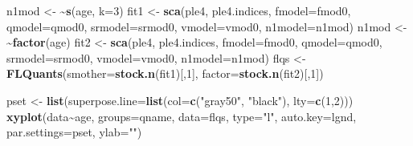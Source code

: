 \documentclass[
]{book}
\newenvironment{Shaded}{\begin{snugshade}}{\end{snugshade}}
\newcommand{\AttributeTok}[1]{\textcolor[rgb]{0.13,0.29,0.53}{#1}}
\newcommand{\DecValTok}[1]{\textcolor[rgb]{0.00,0.00,0.81}{#1}}
\newcommand{\ErrorTok}[1]{\textcolor[rgb]{0.64,0.00,0.00}{\textbf{#1}}}
\newcommand{\FunctionTok}[1]{\textcolor[rgb]{0.13,0.29,0.53}{\textbf{#1}}}
\newcommand{\NormalTok}[1]{#1}
\newcommand{\OtherTok}[1]{\textcolor[rgb]{0.56,0.35,0.01}{#1}}
\newcommand{\SpecialCharTok}[1]{\textcolor[rgb]{0.81,0.36,0.00}{\textbf{#1}}}
\newcommand{\StringTok}[1]{\textcolor[rgb]{0.31,0.60,0.02}{#1}}
\begin{document}
\begin{Shaded}
\begin{Highlighting}[]
\NormalTok{n1mod }\OtherTok{\textless{}{-}} \ErrorTok{\textasciitilde{}}\FunctionTok{s}\NormalTok{(age, }\AttributeTok{k=}\DecValTok{3}\NormalTok{)}
\NormalTok{fit1 }\OtherTok{\textless{}{-}} \FunctionTok{sca}\NormalTok{(ple4, ple4.indices, }\AttributeTok{fmodel=}\NormalTok{fmod0, }\AttributeTok{qmodel=}\NormalTok{qmod0, }\AttributeTok{srmodel=}\NormalTok{srmod0, }\AttributeTok{vmodel=}\NormalTok{vmod0, }\AttributeTok{n1model=}\NormalTok{n1mod)}
\NormalTok{n1mod }\OtherTok{\textless{}{-}} \ErrorTok{\textasciitilde{}}\FunctionTok{factor}\NormalTok{(age)}
\NormalTok{fit2 }\OtherTok{\textless{}{-}} \FunctionTok{sca}\NormalTok{(ple4, ple4.indices, }\AttributeTok{fmodel=}\NormalTok{fmod0, }\AttributeTok{qmodel=}\NormalTok{qmod0, }\AttributeTok{srmodel=}\NormalTok{srmod0, }\AttributeTok{vmodel=}\NormalTok{vmod0, }\AttributeTok{n1model=}\NormalTok{n1mod)}
\NormalTok{flqs }\OtherTok{\textless{}{-}} \FunctionTok{FLQuants}\NormalTok{(}\AttributeTok{smother=}\FunctionTok{stock.n}\NormalTok{(fit1)[,}\DecValTok{1}\NormalTok{], }\AttributeTok{factor=}\FunctionTok{stock.n}\NormalTok{(fit2)[,}\DecValTok{1}\NormalTok{])}
\end{Highlighting}
\end{Shaded}

\begin{Shaded}
\begin{Highlighting}[]
\NormalTok{pset }\OtherTok{\textless{}{-}} \FunctionTok{list}\NormalTok{(}\AttributeTok{superpose.line=}\FunctionTok{list}\NormalTok{(}\AttributeTok{col=}\FunctionTok{c}\NormalTok{(}\StringTok{"gray50"}\NormalTok{, }\StringTok{"black"}\NormalTok{), }\AttributeTok{lty=}\FunctionTok{c}\NormalTok{(}\DecValTok{1}\NormalTok{,}\DecValTok{2}\NormalTok{)))}
\FunctionTok{xyplot}\NormalTok{(data}\SpecialCharTok{\textasciitilde{}}\NormalTok{age, }\AttributeTok{groups=}\NormalTok{qname, }\AttributeTok{data=}\NormalTok{flqs, }\AttributeTok{type=}\StringTok{"l"}\NormalTok{, }\AttributeTok{auto.key=}\NormalTok{lgnd, }\AttributeTok{par.settings=}\NormalTok{pset, }\AttributeTok{ylab=}\StringTok{""}\NormalTok{)}
\end{Highlighting}
\end{Shaded}
\end{document}
